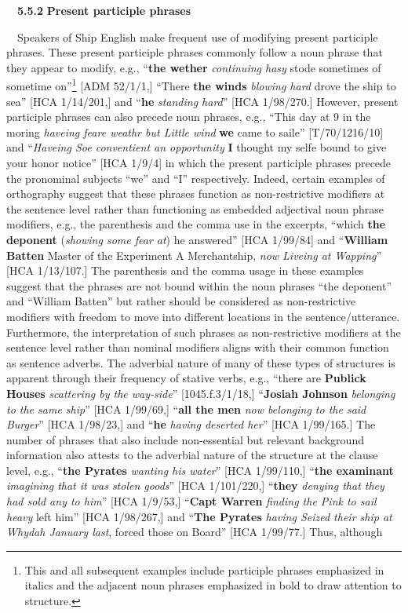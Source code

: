\begin{styleStandard}
\ \ \textbf{5.5.2} \textbf{Present participle phrases }
\end{styleStandard}


\begin{styleStandard}
\ \ Speakers of Ship English make frequent use of modifying present participle phrases. These present participle phrases commonly follow a noun phrase that they appear to modify, e.g., “\textbf{the wether} \textit{continuing hasy} stode sometimes of sometime on”\footnote{ This and all subsequent examples include participle phrases emphasized in italics and the adjacent noun phrases emphasized in bold to draw attention to structure.} [ADM 52/1/1,] “There \textbf{the winds} \textit{blowing hard} drove the ship to sea” [HCA 1/14/201,] and “\textbf{he} \textit{standing hard}” [HCA 1/98/270.] However, present participle phrases can also precede noun phrases, e.g., “This day at 9 in the moring \textit{haveing feare weathr but Little wind }\textbf{we }came to saile” [T/70/1216/10] and “\textit{Haveing Soe conventient an opportunity}\textbf{ }\textbf{I} thought my selfe bound to give your honor notice” [HCA 1/9/4] in which the present participle phrases precede the pronominal subjects “we” and “I” respectively. Indeed, certain examples of orthography suggest that these phrases function as non-restrictive modifiers at the sentence level rather than functioning as embedded adjectival noun phrase modifiers, e.g., the parenthesis and the comma use in the excerpts, “which \textbf{the deponent} (\textit{showing some fear at}) he answered” [HCA 1/99/84] and “\textbf{William Batten} Master of the Experiment A Merchantship, \textit{now Liveing at Wapping}” [HCA 1/13/107.] The parenthesis and the comma usage in these examples suggest that the phrases are not bound within the noun phrases “the deponent” and “William Batten” but rather should be considered as non-restrictive modifiers with freedom to move into different locations in the sentence/utterance. Furthermore, the interpretation of such phrases as non-restrictive modifiers at the sentence level rather than nominal modifiers aligns with their common function as sentence adverbs. The adverbial nature of many of these types of structures is apparent through their frequency of stative verbs, e.g., “there are \textbf{Publick Houses} \textit{scattering by the way-side}” [1045.f.3/1/18,] “\textbf{Josiah Johnson} \textit{belonging to the same ship}” [HCA 1/99/69,] “\textbf{all the men} \textit{now belonging to the said Burger}” [HCA 1/98/23,] and “\textbf{he} \textit{having deserted her}” [HCA 1/99/165.] The number of phrases that also include non-essential but relevant background information also attests to the adverbial nature of the structure at the clause level, e.g., “\textbf{the Pyrates} \textit{wanting his water}” [HCA 1/99/110,] “\textbf{the examinant} \textit{imagining that it was stolen goods}” [HCA 1/101/220,] “\textbf{they} \textit{denying that they had sold any to him}” [HCA 1/9/53,] “\textbf{Capt Warren}\textit{ finding the Pink to sail heavy }left him” [HCA 1/98/267,] and “\textbf{The Pyrates} \textit{having Seized their ship at Whydah January last}, forced those on Board” [HCA 1/99/77.] Thus, although 
\end{styleStandard}
